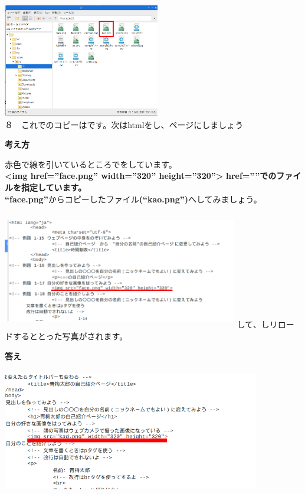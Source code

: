 \documentclass[a4paper,12pt]{jarticle}
\begin{document}
\begin{minipage}{0.45\linewidth}
  \includegraphics[width=\linewidth,height=5cm]{textbook-img170.png}\\
  ８　これでのコピーはです。次はhtmlをし、ページにしましょう
\end{minipage}

\clearpage
\flushleft
\textbf{考え方}\ \


赤色で線を引いているところでをしています。\\
\textbf{{\textless}img href=”face.png” width=”320” height=”320”{\textgreater}}
\textbf{href=””でのファイルを指定しています。}\\
\textbf{“face.png”}からコピーしたファイル\textbf{(“kao.png”)}へしてみましょう。

\begin{minipage}{16.576cm}
  \includegraphics[width=10.296cm,height=5.145cm]{textbook-img171.png}
  \newline
  して、しリロードするととった写真がされます。
\end{minipage}

\flushleft
\textbf{答え}

\includegraphics[width=11.255cm,height=5.482cm]{textbook-img172.png}
\end{document}
